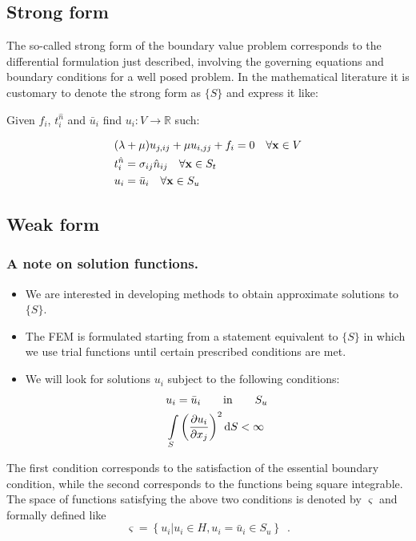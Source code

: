 \subsection{Strong form}
The so-called strong form of the boundary value problem corresponds to the differential formulation just described, involving the governing equations and boundary conditions for a well posed problem. In the mathematical literature it is customary to denote the strong form as $\{ S \}$ and express it like:

Given $f_i$, $t_i^{\hat n}$ and ${\bar u_i}$ find ${u_i}:V \to \mathbb{R}$ such:

\begin{equation} \label{eq:navier_2}
\begin{split}
&(\lambda  + \mu)u_{j,ij} + \mu u_{i,jj} + f_i = 0 \quad \forall \vb{x} \in V \\
&t_i^{\hat n} = \sigma _{ij} \hat{n}_{ij} \quad \forall \vb{x} \in S_t\\
&u_i = \bar{u}_i \quad \forall \vb{x} \in S_u
\end{split}
\end{equation}


\subsection{Weak form}

\subsubsection*{A note on solution functions.}
\begin{itemize}
\item We are interested in developing methods to obtain approximate solutions to $\{S\}$.
\item The FEM is formulated starting from a statement equivalent to $\{ S \}$ in which we use trial functions until certain prescribed conditions are met.
\item We will look for solutions $u_i$ subject to the following conditions:
\begin{align*}
&u_i = \bar u_i \qquad \text{in} \qquad S_u\\
&\int\limits_S \left(\pdv{u_i}{x_j} \right)^2 \dd{S} < \infty
\end{align*}

\end{itemize}

The first condition corresponds to the satisfaction of the essential boundary condition, while the second corresponds to the functions being square integrable. The space of functions satisfying the above two conditions is denoted by $\varsigma$ and formally defined like
\[\varsigma = \left\{u_i\left| {u_i} \in H, {u_i} = \bar{u}_i \in S_u \right. \right\} \enspace .\]

